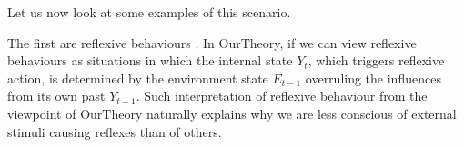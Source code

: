 \documentclass[utf8]{article}
\begin{document}
            
            
            
            
            
            
            
            
           	
           	
         
                

                Let us now look at some examples of this scenario. 
                
               The first are reflexive behaviours \citep{casali2013theoretically}. 
               In \ac{OurTheory}, if we can view reflexive behaviours as situations in which the internal state $Y_t$, which triggers reflexive action, is determined by the environment state $E_{t-1}$ overruling the influences from its own past $Y_{t-1}$.  Such interpretation of reflexive behaviour from the viewpoint of \ac{OurTheory} naturally explains why we are less conscious of external stimuli causing reflexes than of others. 
\end{document}
